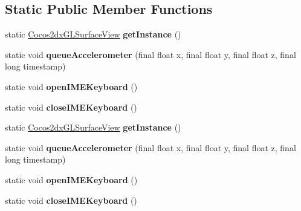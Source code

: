 \subsection*{Static Public Member Functions}
\begin{DoxyCompactItemize}
\item 
\mbox{\label{classorg_1_1cocos2dx_1_1lib_1_1Cocos2dxGLSurfaceView_a5ef75c97d7e4555550bc5e8a668230fb}} 
static \hyperlink{classorg_1_1cocos2dx_1_1lib_1_1Cocos2dxGLSurfaceView}{Cocos2dx\+G\+L\+Surface\+View} {\bfseries get\+Instance} ()
\item 
\mbox{\label{classorg_1_1cocos2dx_1_1lib_1_1Cocos2dxGLSurfaceView_a3c1b57a5239b1f88be075aadd1522bde}} 
static void {\bfseries queue\+Accelerometer} (final float x, final float y, final float z, final long timestamp)
\item 
\mbox{\label{classorg_1_1cocos2dx_1_1lib_1_1Cocos2dxGLSurfaceView_af4590fea88ab57a826fffc48ff6495a0}} 
static void {\bfseries open\+I\+M\+E\+Keyboard} ()
\item 
\mbox{\label{classorg_1_1cocos2dx_1_1lib_1_1Cocos2dxGLSurfaceView_ae50fb4f8f0bebb13765397a71641a5f3}} 
static void {\bfseries close\+I\+M\+E\+Keyboard} ()
\item 
\mbox{\label{classorg_1_1cocos2dx_1_1lib_1_1Cocos2dxGLSurfaceView_a5ef75c97d7e4555550bc5e8a668230fb}} 
static \hyperlink{classorg_1_1cocos2dx_1_1lib_1_1Cocos2dxGLSurfaceView}{Cocos2dx\+G\+L\+Surface\+View} {\bfseries get\+Instance} ()
\item 
\mbox{\label{classorg_1_1cocos2dx_1_1lib_1_1Cocos2dxGLSurfaceView_a3c1b57a5239b1f88be075aadd1522bde}} 
static void {\bfseries queue\+Accelerometer} (final float x, final float y, final float z, final long timestamp)
\item 
\mbox{\label{classorg_1_1cocos2dx_1_1lib_1_1Cocos2dxGLSurfaceView_af4590fea88ab57a826fffc48ff6495a0}} 
static void {\bfseries open\+I\+M\+E\+Keyboard} ()
\item 
\mbox{\label{classorg_1_1cocos2dx_1_1lib_1_1Cocos2dxGLSurfaceView_ae50fb4f8f0bebb13765397a71641a5f3}} 
static void {\bfseries close\+I\+M\+E\+Keyboard} ()
\end{DoxyCompactItemize}
